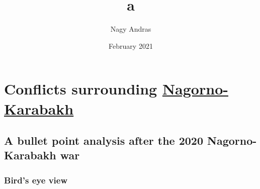 \documentclass{article}
\title{a}
\author{Nagy Andras}
\date{February 2021}
\begin{document}
\section{Conflicts surrounding
\href{https://en.wikipedia.org/wiki/Nagorno-Karabakh}{Nagorno-Karabakh}}\label{conflicts-surrounding-nagorno-karabakh}

\subsection{A bullet point analysis after the 2020 Nagorno-Karabakh
war}\label{a-bullet-point-analysis-after-the-2020-nagorno-karabakh-war}

\subsubsection{Bird's eye view}\label{birds-eye-view}
\end{document}
